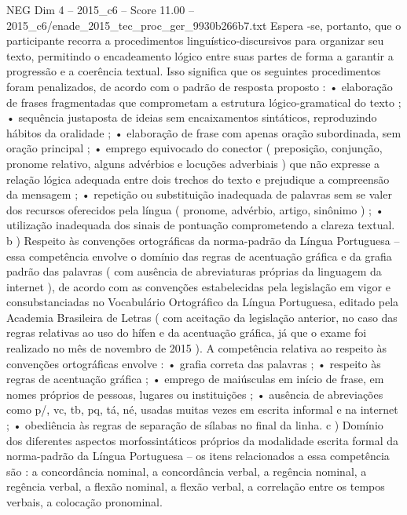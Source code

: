 \begin{textsample}{NEG Dim 4 – 2015\_c6 – Score 11.00 – 2015\_c6/enade\_2015\_tec\_proc\_ger\_9930b266b7.txt}
Espera -se, portanto, que o participante recorra a procedimentos linguístico-discursivos para organizar seu texto, permitindo o encadeamento lógico entre suas partes de forma a garantir a progressão e a coerência textual.
Isso significa que os seguintes procedimentos foram penalizados, de acordo com o padrão de resposta proposto : • elaboração de frases fragmentadas que comprometam a estrutura lógico-gramatical do texto ; • sequência justaposta de ideias sem encaixamentos sintáticos, reproduzindo hábitos da oralidade ; • elaboração de frase com apenas oração subordinada, sem oração principal ; • emprego equivocado do conector ( preposição, conjunção, pronome relativo, alguns advérbios e locuções adverbiais ) que não expresse a relação lógica adequada entre dois trechos do texto e prejudique a compreensão da mensagem ; • repetição ou substituição inadequada de palavras sem se valer dos recursos oferecidos pela língua ( pronome, advérbio, artigo, sinônimo ) ; • utilização inadequada dos sinais de pontuação comprometendo a clareza textual. b ) Respeito às convenções ortográficas da norma-padrão da Língua Portuguesa – essa competência envolve o domínio das regras de acentuação gráfica e da grafia padrão das palavras ( com ausência de abreviaturas próprias da linguagem da internet ), de acordo com as convenções estabelecidas pela legislação em vigor e consubstanciadas no Vocabulário Ortográfico da Língua Portuguesa, editado pela Academia Brasileira de Letras ( com aceitação da legislação anterior, no caso das regras relativas ao uso do hífen e da acentuação gráfica, já que o exame foi realizado no mês de novembro de 2015 ).
A competência relativa ao respeito às convenções ortográficas envolve : • grafia correta das palavras ; • respeito às regras de acentuação gráfica ; • emprego de maiúsculas em início de frase, em nomes próprios de pessoas, lugares ou instituições ; • ausência de abreviações como p/, vc, tb, pq, tá, né, usadas muitas vezes em escrita informal e na internet ; • obediência às regras de separação de sílabas no final da linha. c ) Domínio dos diferentes aspectos morfossintáticos próprios da modalidade escrita formal da norma-padrão da Língua Portuguesa – os itens relacionados a essa competência são : a concordância nominal, a concordância verbal, a regência nominal, a regência verbal, a flexão nominal, a flexão verbal, a correlação entre os tempos verbais, a colocação pronominal.

\end{textsample}
